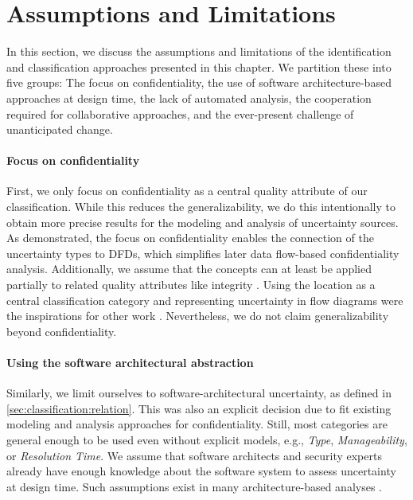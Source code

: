 \section{Assumptions and Limitations}%
\label{sec:classification:limitations}

In this section, we discuss the assumptions and limitations of the identification and classification approaches presented in this chapter.
We partition these into five groups: The focus on confidentiality, the use of software architecture-based approaches at design time, the lack of automated analysis, the cooperation required for collaborative approaches, and the ever-present challenge of unanticipated change.

\paragraph{Focus on confidentiality}
First, we only focus on confidentiality as a central quality attribute of our classification.
While this reduces the generalizability, we do this intentionally to obtain more precise results for the modeling and analysis of uncertainty sources.
As demonstrated, the focus on confidentiality enables the connection of the uncertainty types to \acp{DFD}, which simplifies later data flow-based confidentiality analysis.
Additionally, we assume that the concepts can at least be applied partially to related quality attributes like integrity \cite{boltz_extensible_2024,seifermann_architectural_2022}.
Using the location as a central classification category and representing uncertainty in flow diagrams were the inspirations for other work \cite{acosta_uncertainty_2022,camara_uncertainty_2024}.
Nevertheless, we do not claim generalizability beyond confidentiality.

\paragraph{Using the software architectural abstraction}
Similarly, we limit ourselves to software-architectural uncertainty, as defined in \autoref{sec:classification:relation}.
This was also an explicit decision due to fit existing modeling \cite{reussner_modeling_2016,seifermann_unified_2021} and analysis \cite{seifermann_data-driven_2019,seifermann_detecting_2022,tuma_flaws_2019} approaches for confidentiality.
Still, most categories are general enough to be used even without explicit models, e.g., \emph{Type}, \emph{Manageability}, or \emph{Resolution Time}.
We assume that software architects and security experts already have enough knowledge about the software system to assess uncertainty at design time.
Such assumptions exist in many architecture-based analyses \cite{seifermann_architectural_2022,walter_context-based_2023}.

